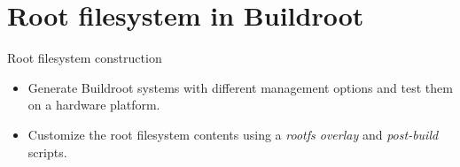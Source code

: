 \section{Root filesystem in Buildroot}

\setuplabframe
{Root filesystem construction}
{
  \begin{itemize}
  \item Generate Buildroot systems with different 
    management options and test them on a hardware platform.
  \item Customize the root filesystem contents using a {\em rootfs
      overlay} and {\em post-build} scripts.
  \end{itemize}
}
